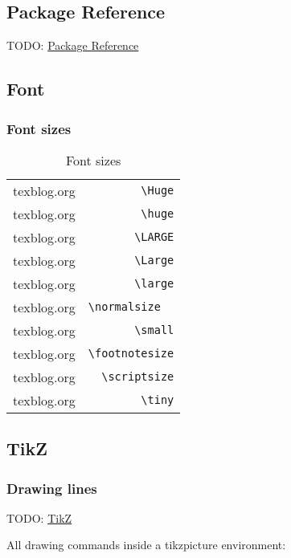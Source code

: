 \documentclass{article}
\begin{document}
\subsection{Package Reference}
TODO: \href{https://en.wikibooks.org/wiki/LaTeX/Package_Reference}{Package Reference}

\subsection{Font}
\subsubsection{Font sizes}
\begin{table}[H]
    \centering
    \begin{tabular}[]{lr}
        \Huge{texblog.org}         & \verb|\Huge|  \\
        \huge{texblog.org}         & \verb|\huge|  \\
        \LARGE{texblog.org}        & \verb|\LARGE|  \\
        \Large{texblog.org}        & \verb|\Large|  \\
        \large{texblog.org}        & \verb|\large|  \\
        \normalsize  {texblog.org} & \verb|\normalsize  |  \\
        \small{texblog.org}        & \verb|\small|  \\
        \footnotesize{texblog.org} & \verb|\footnotesize|  \\
        \scriptsize{texblog.org}   & \verb|\scriptsize| \\
        \tiny{texblog.org}         & \verb|\tiny| \\
    \end{tabular}
    \caption{Font sizes}
    \label{tab:1}
\end{table}

\subsection{TikZ}
\subsubsection{Drawing lines}

TODO: \href{https://en.wikibooks.org/wiki/LaTeX/PGF/TikZ}{TikZ}

All drawing commands inside a tikzpicture environment:
\end{document}
